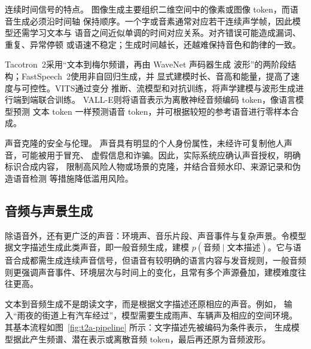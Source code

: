 连续时间信号的特点。
图像生成主要组织二维空间中的像素或图像 token，而语音生成必须沿时间轴
保持顺序。一个字或音素通常对应若干连续声学帧，因此模型还需学习文本与
语音之间近似单调的时间对应关系。对齐错误可能造成漏词、重复、异常停顿
或语速不稳定；生成时间越长，还越难保持音色和韵律的一致。


Tacotron~2\cite{tacotron2}采用“文本到梅尔频谱，再由 WaveNet 声码器生成
波形”的两阶段结构；FastSpeech~2\cite{fastspeech2}使用非自回归生成，并
显式建模时长、音高和能量，提高了速度与可控性。VITS\cite{vits}通过变分
推断、流模型和对抗训练，将声学建模与波形生成进行端到端联合训练。
VALL-E\cite{valle}则将语音表示为离散神经音频编码 token，像语言模型预测
文本 token 一样预测语音 token，并可根据较短的参考语音进行零样本合成。

\begin{importantnote}
  声音克隆的安全与伦理。
  声音具有明显的个人身份属性，未经许可复制他人声音，可能被用于冒充、
  虚假信息和诈骗。因此，实际系统应确认声音授权，明确标识合成内容，
  限制高风险人物或场景的克隆，并结合音频水印、来源记录和伪造语音检测
  等措施降低滥用风险\cite{nist-synthetic}。
\end{importantnote}

\subsection{音频与声景生成}
\label{sub:t2a}

除语音外，还有更广泛的声音：环境声、音乐片段、声音事件与复杂声景。令模型据文字描述生成此类声音，即一般音频生成，建模 $p(\text{音频}\mid\text{文本描述})$。它与语音合成都需生成连续声音信号，但语音有较明确的语言内容与发音规则，一般音频则更强调声音事件、环境层次与时间上的变化，且常有多个声源叠加，建模难度往往更高。


文本到音频生成不是朗读文字，而是根据文字描述还原相应的声音。例如，
输入“雨夜的街道上有汽车经过”，模型需要生成雨声、车辆声及相应的空间环境。
其基本流程如图~\ref{fig:t2a-pipeline} 所示：文字描述先被编码为条件表示，
生成模型据此产生频谱、潜在表示或离散音频 token，最后再还原为音频波形。

